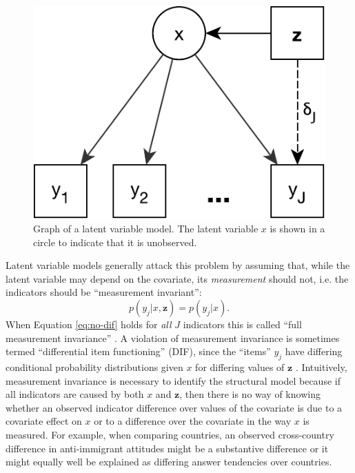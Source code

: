 \documentclass[letterpaper,12pt]{article}
\begin{document}
\begin{figure}\centering
	\includegraphics[width=.4\textwidth]{figures/LVM}
	\caption{Graph of a latent variable model. The latent variable $x$ is shown in a circle to indicate that it is unobserved. }
	\label{fig:LVM}
\end{figure}

Latent variable models generally attack this problem by assuming that, while the latent variable may depend on the covariate, its \emph{measurement} should not, i.e. the indicators should be ``measurement invariant'':
\begin{equation}
	p(y_j | x, \mathbf{z}) = p(y_j | x).
	\label{eq:no-dif}
\end{equation}
When Equation \ref{eq:no-dif} holds for \emph{all} $J$ indicators this is called ``full measurement invariance'' \citep{meredith1993measurement}. 
A violation of  measurement invariance is sometimes termed ``differential item functioning'' (DIF), since the ``items'' $y_j$ have differing conditional probability distributions given $x$ for differing values of $\mathbf{z}$ \citep{mellenbergh1989item}.
Intuitively, measurement invariance is necessary to identify the structural model  because if all indicators are caused by both $x$ and $\mathbf{z}$, then there is no way of knowing whether an observed indicator difference  over values of the covariate is due to a covariate effect on  $x$ or to a difference over the covariate in the way $x$ is measured. For example, when comparing countries, an observed cross-country difference in anti-immigrant attitudes might be a substantive difference or it might equally well be explained as differing answer tendencies over countries. 
\end{document}

